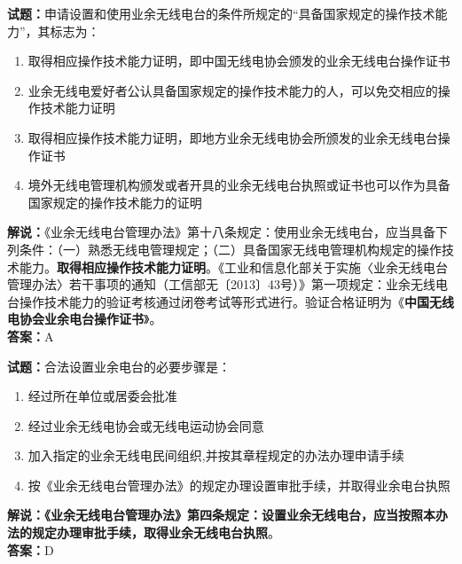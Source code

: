 \documentclass{ctexbook}
\begin{document}
\noindent\textbf{试题：}申请设置和使用业余无线电台的条件所规定的“具备国家规定的操作技术能力”，其标志为：
\begin{enumerate}[leftmargin=3em]
  \item 取得相应操作技术能力证明，即中国无线电协会颁发的业余无线电台操作证书
  \item 业余无线电爱好者公认具备国家规定的操作技术能力的人，可以免交相应的操作技术能力证明
  \item 取得相应操作技术能力证明，即地方业余无线电协会所颁发的业余无线电台操作证书
  \item 境外无线电管理机构颁发或者开具的业余无线电台执照或证书也可以作为具备国家规定的操作技术能力的证明
\end{enumerate}
\noindent\textbf{解说：}《业余无线电台管理办法》第十八条规定：使用业余无线电台，应当具备下列条件：（一）熟悉无线电管理规定；（二）具备国家无线电管理机构规定的操作技术能力。\textbf{取得相应操作技术能力证明}。《工业和信息化部关于实施〈业余无线电台管理办法〉若干事项的通知（工信部无〔2013〕43号）》第一项规定：业余无线电台操作技术能力的验证考核通过闭卷考试等形式进行。验证合格证明为《\textbf{中国无线电协会业余电台操作证书}》。\\\noindent\textbf{答案：}A

\vspace{\baselineskip}

\noindent\textbf{试题：}合法设置业余电台的必要步骤是：
\begin{enumerate}[leftmargin=3em]
  \item 经过所在单位或居委会批准
  \item 经过业余无线电协会或无线电运动协会同意
  \item 加入指定的业余无线电民间组织,并按其章程规定的办法办理申请手续
  \item 按《业余无线电台管理办法》的规定办理设置审批手续，并取得业余电台执照
\end{enumerate}
\noindent\textbf{解说：}\textbf{《业余无线电台管理办法》第四条规定：设置业余无线电台，应当按照本办法的规定办理审批手续，取得业余无线电台执照}。\\\noindent\textbf{答案：}D

\vspace{\baselineskip}
\end{document}
